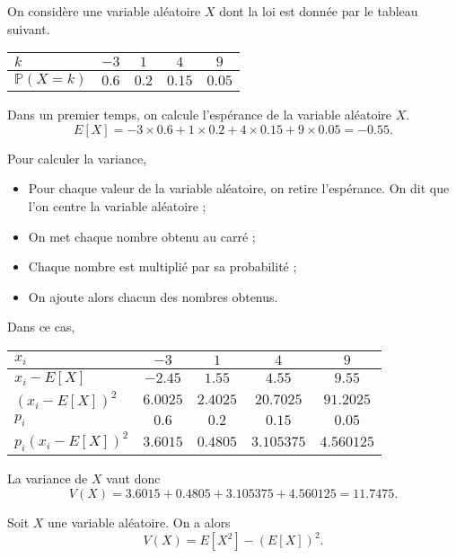 \documentclass[11pt,fleqn, openany]{book} %
\begin{document}
\begin{example}On considère une variable aléatoire $X$ dont la loi est donnée par le tableau suivant.

\renewcommand{\arraystretch}{2.2}
\begin{center}
\begin{tabular}{|l|c|c|c|c|}
\hline
$k$ & $-3$& $1$ & $4$ & $9$ \\
\hline
$\mathbb{P}(X=k)$ & $0.6$ & $0.2$ & $0.15$ & $0.05$\\
\hline \end{tabular}
\end{center}

Dans un premier temps, on calcule l'espérance de la variable aléatoire $X$.
\[E[X] = -3 \times 0.6 + 1 \times 0.2 + 4 \times 0.15 + 9 \times 0.05=-0.55.\]

Pour calculer la variance,
\begin{itemize}
\item Pour chaque valeur de la variable aléatoire, on retire l'espérance. On dit que l'on centre la variable aléatoire ;
\item On met chaque nombre obtenu au carré ;
\item Chaque nombre est multiplié par sa probabilité ;
\item On ajoute alors chacun des nombres obtenus.
\end{itemize}
\newpage
Dans ce cas,
\renewcommand{\arraystretch}{2.2}
\begin{center}
\begin{tabular}{|l|c|c|c|c|}
\hline
$x_i$ & $-3$& $1$ & $4$ & $9$ \\
\hline
$x_i-E[X]$ & $-2.45$ & $1.55$ & $4.55$ & $9.55$ \\
\hline
$(x_i-E[X])^2$ & $6.0025$ & $2.4025$ & $20.7025$ & $91.2025$\\
\hline
$p_i$ & $0.6$ & $0.2$ & $0.15$ & $0.05$\\
\hline
$p_i(x_i-E[X])^2$ & $3.6015$ & $0.4805$ & $3.105375$ & $4.560125$\\
\hline \end{tabular}
\end{center}

La variance de $X$ vaut donc 
\[ V(X) = 3.6015+0.4805+3.105375+4.560125=11.7475 .\]\end{example}

\begin{proposition}
Soit $X$ une variable aléatoire. On a alors
\[V(X)=E[X^2]-(E[X])^2.\]
\end{proposition}
\end{document}
